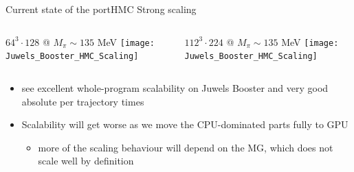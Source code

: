 \documentclass[xcolor={dvipsnames,table}]{beamer}
\begin{document}
\begin{frame}{Current state of the port}{HMC Strong scaling}
  \begin{columns}
      \begin{hpcablock}{$64^3 \cdot 128$ @ $M_\pi \sim 135$ MeV}
        \texttt{[image: Juwels\_Booster\_HMC\_Scaling]}
      \end{hpcablock}
      \begin{hpcablock}{$112^3 \cdot 224$ @ $M_\pi \sim 135$ MeV}
        \texttt{[image: Juwels\_Booster\_HMC\_Scaling]}
      \end{hpcablock}
  \end{columns}
  \vspace{0.2cm}
  \begin{itemize}
    \item see excellent whole-program scalability on Juwels Booster and very good absolute per trajectory times
      \vspace{0.2cm}  
    \item Scalability will get worse as we move the CPU-dominated parts fully to GPU
      \begin{itemize}
        \item more of the scaling behaviour will depend on the MG, which does not scale well by definition
      \end{itemize}
  \end{itemize}
\end{frame}
  
\end{document}
